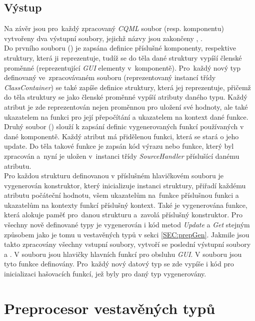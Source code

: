 \documentclass[11pt,twoside,a4paper]{book}
\begin{document}
\subsection{Výstup}
Na závěr jsou pro~každý zpracovaný \textit{CQML} soubor (resp. komponentu) vytvořeny dva výstupní soubory, jejichž názvy jsou zakončeny , .\\ 
Do prvního souboru () je zapsána definice příslušné komponenty, respektive struktury, která ji reprezentuje, tudíž se do těla dané struktury vypíší členské proměnné (reprezentující \textit{GUI} elementy v~komponentě). Pro~každý nový typ definovaný ve~zpracovávaném souboru (reprezentovaný instancí třídy \textit{ClassContainer}) se také zapíše definice struktury, která jej reprezentuje, přičemž do těla struktury se jako členské proměnné vypíší atributy daného typu. Každý atribut je zde reprezentován nejen proměnnou pro uložení své hodnoty, ale také ukazatelem na funkci pro její přepočítání a ukazatelem na kontext dané funkce.\\
Druhý soubor () slouží k zapsání definic vygenerovaných funkcí používaných v dané komponentě. Každý atribut má přidělenou funkci, která se stará o jeho update. Do těla takové funkce je zapsán kód výrazu nebo funkce, který byl zpracován a~nyní je uložen v~instanci třídy \textit{SourceHandler} příslušící danému atributu.\\
Pro každou strukturu definovanou v příslušném hlavičkovém souboru je vygenerován konstruktor, který inicializuje instanci struktury, přiřadí každému atributu počáteční hodnotu, všem ukazatelům na~funkce příslušnou funkci a ukazatelům na kontexty funkcí příslušný kontext. Také je vygenerována funkce, která alokuje paměť pro~danou strukturu a~zavolá příslušný konstruktor. Pro všechny nově definované typy je vygenerován i kód metod \textit{Update} a \textit{Get} stejným způsobem jako je tomu u vestavěných typů v sekci \ref{SEC:prepGen}.
Jakmile jsou takto zpracovány všechny vstupní soubory, vytvoří se poslední výstupní soubory  a . V souboru  jsou hlavičky hlavních funkcí pro obsluhu \textit{GUI}. V souboru  jsou tyto funkce definovány. Pro~každý nový datový typ se zde vypíše i kód pro inicializaci hašovacích funkcí, jež byly pro daný typ vygenerovány.\\


\section{\label{SEC:aa}Preprocesor vestavěných typů}
\end{document}
